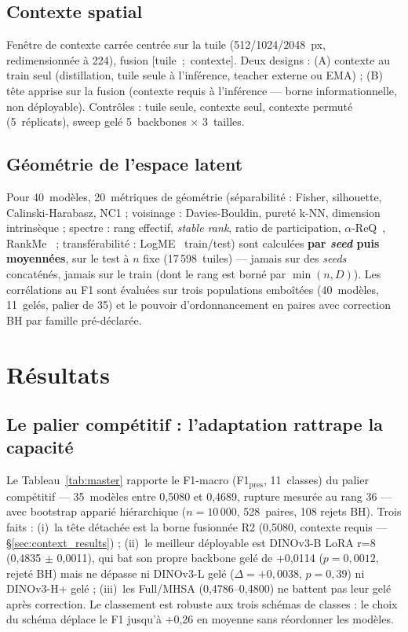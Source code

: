 \documentclass[11pt,a4paper]{article}
\newcommand{\fmpres}{F1$_{\text{pres}}$}
\begin{document}
\subsection{Contexte spatial}
\label{sec:context}

Fenêtre de contexte carrée centrée sur la tuile (512/1024/2048~px, redimensionnée à 224), fusion [tuile~;~contexte]. Deux designs : (A) contexte au train seul (distillation, tuile seule à l'inférence, teacher externe ou EMA) ; (B) tête apprise sur la fusion (contexte requis à l'inférence — borne informationnelle, non déployable). Contrôles : tuile seule, contexte seul, contexte permuté (5~réplicats), sweep gelé 5~backbones $\times$ 3~tailles.

\subsection{Géométrie de l'espace latent}
\label{sec:latent_methods}

Pour 40~modèles, 20~métriques de géométrie (séparabilité : Fisher, silhouette, Calinski-Harabasz, NC1 ; voisinage : Davies-Bouldin, pureté k-NN, dimension intrinsèque ; spectre : rang effectif, \emph{stable rank}, ratio de participation, $\alpha$-ReQ~\autocite{agrawal2022alphareq}, RankMe~\autocite{garrido2023rankme} ; transférabilité : LogME~\autocite{you2021logme} train/test) sont calculées \textbf{par \emph{seed} puis moyennées}, sur le test à $n$ fixe (17\,598~tuiles) — jamais sur des \emph{seeds} concaténés, jamais sur le train (dont le rang est borné par $\min(n,D)$). Les corrélations au F1 sont évaluées sur trois populations emboîtées (40~modèles, 11~gelés, palier de 35) et le pouvoir d'ordonnancement en paires avec correction BH par famille pré-déclarée.

\section{Résultats}
\label{sec:results}

\subsection{Le palier compétitif : l'adaptation rattrape la capacité}
\label{sec:main_result}

Le Tableau~\ref{tab:master} rapporte le F1-macro (\fmpres{}, 11~classes) du palier compétitif — 35~modèles entre 0,5080 et 0,4689, rupture mesurée au rang 36 — avec bootstrap apparié hiérarchique ($n=10\,000$, 528~paires, 108 rejets BH). Trois faits : (i)~la tête détachée est la borne fusionnée R2 (0,5080, contexte requis — \S\ref{sec:context_results}) ; (ii)~le meilleur déployable est DINOv3-B LoRA r=8 (0,4835 $\pm$ 0,0011), qui bat son propre backbone gelé de +0,0114 ($p=0{,}0012$, rejeté BH) mais ne dépasse ni DINOv3-L gelé ($\Delta=+0{,}0038$, $p=0{,}39$) ni DINOv3-H+ gelé ; (iii)~les Full/MHSA (0,4786--0,4800) ne battent pas leur gelé après correction. Le classement est robuste aux trois schémas de classes : le choix du schéma déplace le F1 jusqu'à +0,26 en moyenne sans réordonner les modèles.
\end{document}

